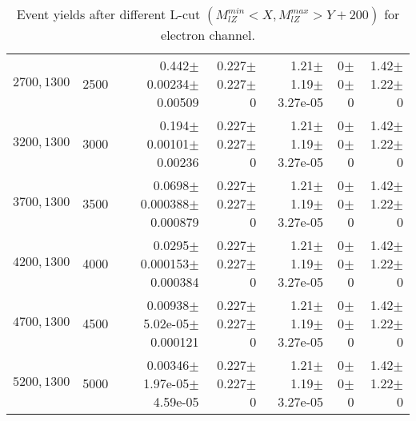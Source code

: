 \documentclass[]{article}
\begin{document}
\begin{table}
\begin{center}
{\begin{tabular}{ |r|r|r|r|r|r|r|}
$2700,1300$ & 2500 & 0.442$\pm$0.00234$\pm$0.00509 & 0.227$\pm$0.227$\pm$0 & 1.21$\pm$1.19$\pm$3.27e-05 & 0$\pm$0$\pm$0 & 1.42$\pm$1.22$\pm$0 \\
$3200,1300$ & 3000 & 0.194$\pm$0.00101$\pm$0.00236 & 0.227$\pm$0.227$\pm$0 & 1.21$\pm$1.19$\pm$3.27e-05 & 0$\pm$0$\pm$0 & 1.42$\pm$1.22$\pm$0 \\
$3700,1300$ & 3500 & 0.0698$\pm$0.000388$\pm$0.000879 & 0.227$\pm$0.227$\pm$0 & 1.21$\pm$1.19$\pm$3.27e-05 & 0$\pm$0$\pm$0 & 1.42$\pm$1.22$\pm$0 \\
$4200,1300$ & 4000 & 0.0295$\pm$0.000153$\pm$0.000384 & 0.227$\pm$0.227$\pm$0 & 1.21$\pm$1.19$\pm$3.27e-05 & 0$\pm$0$\pm$0 & 1.42$\pm$1.22$\pm$0 \\
$4700,1300$ & 4500 & 0.00938$\pm$5.02e-05$\pm$0.000121 & 0.227$\pm$0.227$\pm$0 & 1.21$\pm$1.19$\pm$3.27e-05 & 0$\pm$0$\pm$0 & 1.42$\pm$1.22$\pm$0 \\
$5200,1300$ & 5000 & 0.00346$\pm$1.97e-05$\pm$4.59e-05 & 0.227$\pm$0.227$\pm$0 & 1.21$\pm$1.19$\pm$3.27e-05 & 0$\pm$0$\pm$0 & 1.42$\pm$1.22$\pm$0 \\
\hline 
\end{tabular}
}
\end{center}
\caption{Event yields after different L-cut $(M_{lZ}^{min} < X, M_{lZ}^{max} > Y + 200)$ for electron channel.}
\end{table}
\end{document}
